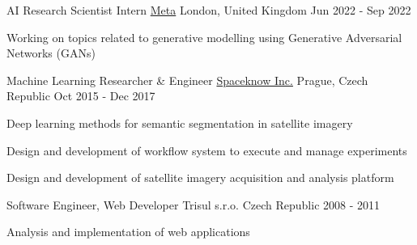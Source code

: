 

\begin{cventries}

  \cventry
    {AI Research Scientist Intern} %
    {\href{https://about.facebook.com}{Meta}} %
    {London, United Kingdom} %
    {Jun 2022 - Sep 2022} %
    {
      \begin{cvitems} %
        \item {Working on topics related to generative modelling using Generative Adversarial Networks (GANs)}
      \end{cvitems}
    }

\cventry
{Machine Learning Researcher \& Engineer} %
{\href{http://spaceknow.com}{Spaceknow Inc.}} %
{Prague, Czech Republic} %
{Oct 2015 - Dec 2017} %
{
	\begin{cvitems} %
		\item {Deep learning methods for semantic segmentation in satellite imagery %
		}
		\item {Design and development of workflow system to execute and manage experiments}
		\item {Design and development of satellite imagery acquisition and analysis platform}
	\end{cvitems}
}

\cventry
{Software Engineer, Web Developer} %
{Trisul s.r.o.} %
{Czech Republic} %
{2008 - 2011} %
{
	\begin{cvitems} %
		\item {Analysis and implementation of web applications %
		}
	\end{cvitems}
}


\end{cventries}
